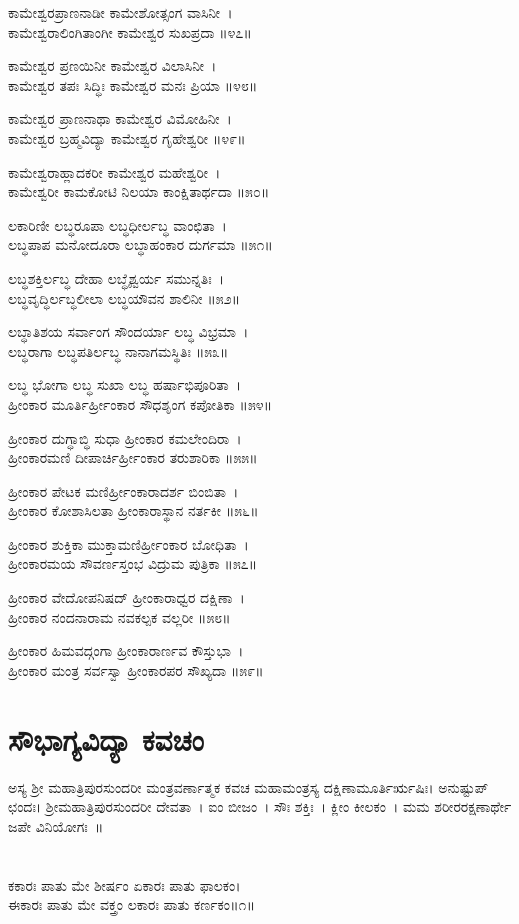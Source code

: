 {ಕಾಮೇಶ್ವರಪ್ರಾಣನಾಡೀ ಕಾಮೇಶೋತ್ಸಂಗ ವಾಸಿನೀ~।\\
ಕಾಮೇಶ್ವರಾಲಿಂಗಿತಾಂಗೀ ಕಾಮೇಶ್ವರ ಸುಖಪ್ರದಾ ॥೪೭॥

ಕಾಮೇಶ್ವರ ಪ್ರಣಯಿನೀ ಕಾಮೇಶ್ವರ ವಿಲಾಸಿನೀ~।\\
ಕಾಮೇಶ್ವರ ತಪಃ ಸಿದ್ಧಿಃ ಕಾಮೇಶ್ವರ ಮನಃ ಪ್ರಿಯಾ ॥೪೮॥

ಕಾಮೇಶ್ವರ ಪ್ರಾಣನಾಥಾ ಕಾಮೇಶ್ವರ ವಿಮೋಹಿನೀ~।\\
ಕಾಮೇಶ್ವರ ಬ್ರಹ್ಮವಿದ್ಯಾ ಕಾಮೇಶ್ವರ ಗೃಹೇಶ್ವರೀ ॥೪೯॥

ಕಾಮೇಶ್ವರಾಹ್ಲಾದಕರೀ ಕಾಮೇಶ್ವರ ಮಹೇಶ್ವರೀ~।\\
ಕಾಮೇಶ್ವರೀ ಕಾಮಕೋಟಿ ನಿಲಯಾ ಕಾಂಕ್ಷಿತಾರ್ಥದಾ ॥೫೦॥

ಲಕಾರಿಣೀ ಲಬ್ಧರೂಪಾ ಲಬ್ಧಧೀರ್ಲಬ್ಧ ವಾಂಛಿತಾ~।\\
ಲಬ್ಧಪಾಪ ಮನೋದೂರಾ ಲಬ್ಧಾಹಂಕಾರ ದುರ್ಗಮಾ ॥೫೧॥

ಲಬ್ಧಶಕ್ತಿರ್ಲಬ್ಧ ದೇಹಾ ಲಬ್ಧೈಶ್ವರ್ಯ ಸಮುನ್ನತಿಃ~।\\
ಲಬ್ಧವೃದ್ಧಿರ್ಲಬ್ಧಲೀಲಾ ಲಬ್ಧಯೌವನ ಶಾಲಿನೀ ॥೫೨॥

ಲಬ್ಧಾತಿಶಯ ಸರ್ವಾಂಗ ಸೌಂದರ್ಯಾ ಲಬ್ಧ ವಿಭ್ರಮಾ~।\\
ಲಬ್ಧರಾಗಾ ಲಬ್ಧಪತಿರ್ಲಬ್ಧ ನಾನಾಗಮಸ್ಥಿತಿಃ ॥೫೩॥

ಲಬ್ಧ ಭೋಗಾ ಲಬ್ಧ ಸುಖಾ ಲಬ್ಧ ಹರ್ಷಾಭಿಪೂರಿತಾ~।\\
ಹ್ರೀಂಕಾರ ಮೂರ್ತಿರ್ಹ್ರೀಂಕಾರ ಸೌಧಶೃಂಗ ಕಪೋತಿಕಾ ॥೫೪॥

ಹ್ರೀಂಕಾರ ದುಗ್ಧಾಬ್ಧಿ ಸುಧಾ ಹ್ರೀಂಕಾರ ಕಮಲೇಂದಿರಾ~।\\
ಹ್ರೀಂಕಾರಮಣಿ ದೀಪಾರ್ಚಿರ್ಹ್ರೀಂಕಾರ ತರುಶಾರಿಕಾ ॥೫೫॥

ಹ್ರೀಂಕಾರ ಪೇಟಕ ಮಣಿರ್ಹ್ರೀಂಕಾರಾದರ್ಶ ಬಿಂಬಿತಾ~।\\
ಹ್ರೀಂಕಾರ ಕೋಶಾಸಿಲತಾ ಹ್ರೀಂಕಾರಾಸ್ಥಾನ ನರ್ತಕೀ ॥೫೬॥

ಹ್ರೀಂಕಾರ ಶುಕ್ತಿಕಾ ಮುಕ್ತಾಮಣಿರ್ಹ್ರೀಂಕಾರ ಬೋಧಿತಾ~।\\
ಹ್ರೀಂಕಾರಮಯ ಸೌವರ್ಣಸ್ತಂಭ ವಿದ್ರುಮ ಪುತ್ರಿಕಾ ॥೫೭॥

ಹ್ರೀಂಕಾರ ವೇದೋಪನಿಷದ್ ಹ್ರೀಂಕಾರಾಧ್ವರ ದಕ್ಷಿಣಾ~।\\
ಹ್ರೀಂಕಾರ ನಂದನಾರಾಮ ನವಕಲ್ಪಕ ವಲ್ಲರೀ ॥೫೮॥

ಹ್ರೀಂಕಾರ ಹಿಮವದ್ಗಂಗಾ ಹ್ರೀಂಕಾರಾರ್ಣವ ಕೌಸ್ತುಭಾ~।\\
ಹ್ರೀಂಕಾರ ಮಂತ್ರ ಸರ್ವಸ್ವಾ ಹ್ರೀಂಕಾರಪರ ಸೌಖ್ಯದಾ ॥೫೯॥}
\section{ಸೌಭಾಗ್ಯವಿದ್ಯಾ ಕವಚಂ}
ಅಸ್ಯ ಶ್ರೀ ಮಹಾತ್ರಿಪುರಸುಂದರೀ ಮಂತ್ರವರ್ಣಾತ್ಮಕ ಕವಚ ಮಹಾಮಂತ್ರಸ್ಯ ದಕ್ಷಿಣಾಮೂರ್ತಿರ್ಋಷಿಃ। ಅನುಷ್ಟುಪ್ ಛಂದಃ। ಶ್ರೀಮಹಾತ್ರಿಪುರಸುಂದರೀ ದೇವತಾ~। ಐಂ ಬೀಜಂ~। ಸೌಃ ಶಕ್ತಿಃ~। ಕ್ಲೀಂ ಕೀಲಕಂ~। ಮಮ ಶರೀರರಕ್ಷಣಾರ್ಥೇ ಜಪೇ ವಿನಿಯೋಗಃ~॥\\
\\
\\
ಕಕಾರಃ ಪಾತು ಮೇ ಶೀರ್ಷಂ ಏಕಾರಃ ಪಾತು ಫಾಲಕಂ।\\
ಈಕಾರಃ ಪಾತು ಮೇ ವಕ್ತ್ರಂ ಲಕಾರಃ ಪಾತು ಕರ್ಣಕಂ॥೧॥

